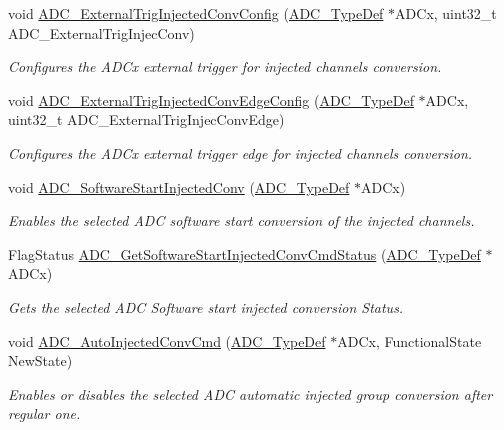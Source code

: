 \begin{DoxyCompactItemize}
void \hyperlink{group___a_d_c_gafc02ce1e84e96b692adf085f61a0bca6}{A\+D\+C\+\_\+\+External\+Trig\+Injected\+Conv\+Config} (\hyperlink{struct_a_d_c___type_def}{A\+D\+C\+\_\+\+Type\+Def} $\ast$A\+D\+Cx, uint32\+\_\+t A\+D\+C\+\_\+\+External\+Trig\+Injec\+Conv)
\begin{DoxyCompactList}\small\item\em Configures the A\+D\+Cx external trigger for injected channels conversion. \end{DoxyCompactList}\item 
void \hyperlink{group___a_d_c_ga62bea56579f04374fbe830d9e55e6fb0}{A\+D\+C\+\_\+\+External\+Trig\+Injected\+Conv\+Edge\+Config} (\hyperlink{struct_a_d_c___type_def}{A\+D\+C\+\_\+\+Type\+Def} $\ast$A\+D\+Cx, uint32\+\_\+t A\+D\+C\+\_\+\+External\+Trig\+Injec\+Conv\+Edge)
\begin{DoxyCompactList}\small\item\em Configures the A\+D\+Cx external trigger edge for injected channels conversion. \end{DoxyCompactList}\item 
void \hyperlink{group___a_d_c_ga79b2f6c3c77925b35495f2db228895de}{A\+D\+C\+\_\+\+Software\+Start\+Injected\+Conv} (\hyperlink{struct_a_d_c___type_def}{A\+D\+C\+\_\+\+Type\+Def} $\ast$A\+D\+Cx)
\begin{DoxyCompactList}\small\item\em Enables the selected A\+DC software start conversion of the injected channels. \end{DoxyCompactList}\item 
Flag\+Status \hyperlink{group___a_d_c_ga8765f8835b8cfed13dce3d8d71767dcc}{A\+D\+C\+\_\+\+Get\+Software\+Start\+Injected\+Conv\+Cmd\+Status} (\hyperlink{struct_a_d_c___type_def}{A\+D\+C\+\_\+\+Type\+Def} $\ast$A\+D\+Cx)
\begin{DoxyCompactList}\small\item\em Gets the selected A\+DC Software start injected conversion Status. \end{DoxyCompactList}\item 
void \hyperlink{group___a_d_c_ga1ff9c3b8e4bbdd2addfd227f1a506a66}{A\+D\+C\+\_\+\+Auto\+Injected\+Conv\+Cmd} (\hyperlink{struct_a_d_c___type_def}{A\+D\+C\+\_\+\+Type\+Def} $\ast$A\+D\+Cx, Functional\+State New\+State)
\begin{DoxyCompactList}\small\item\em Enables or disables the selected A\+DC automatic injected group conversion after regular one. \end{DoxyCompactList}\item 

\end{DoxyCompactItemize}
